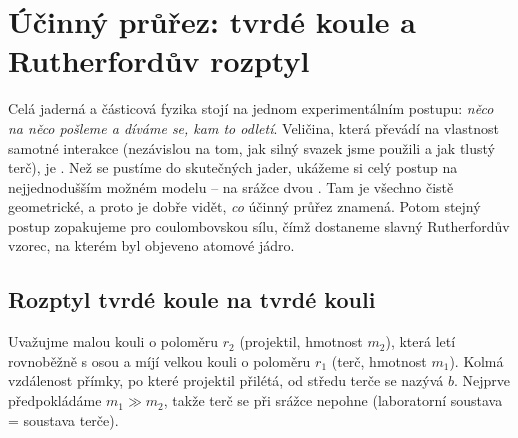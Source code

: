 \section{Účinný průřez: tvrdé koule a Rutherfordův rozptyl}

Celá jaderná a částicová fyzika stojí na jednom experimentálním postupu: \emph{něco na něco pošleme a díváme se, kam to odletí}. Veličina, která převádí  na vlastnost samotné interakce (nezávislou na tom, jak silný svazek jsme použili a jak tlustý terč), je . Než se pustíme do skutečných jader, ukážeme si celý postup na nejjednodušším možném modelu -- na srážce dvou . Tam je všechno čistě geometrické, a proto je dobře vidět, \emph{co} účinný průřez znamená. Potom stejný postup zopakujeme pro coulombovskou sílu, čímž dostaneme slavný Rutherfordův vzorec, na kterém byl objeveno atomové jádro.

\subsection{Rozptyl tvrdé koule na tvrdé kouli}

Uvažujme malou kouli o poloměru $r_2$ (projektil, hmotnost $m_2$), která letí rovnoběžně s osou a míjí velkou kouli o poloměru $r_1$ (terč, hmotnost $m_1$). Kolmá vzdálenost přímky, po které projektil přilétá, od středu terče se nazývá  $b$. Nejprve předpokládáme $m_1 \gg m_2$, takže terč se při srážce nepohne (laboratorní soustava = soustava terče).

\begin{center}
\end{center}

